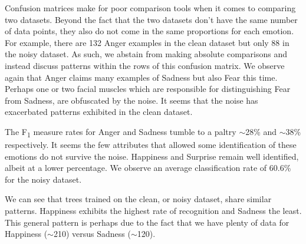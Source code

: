  


Confusion matrices make for poor comparison tools when it comes to comparing two datasets.
Beyond the fact that the two datasets don't have the same number of data points,
they also do not come in the same proportions for each emotion. For example, there are 132 Anger examples in the clean dataset but only
88 in the noisy dataset. As such, we abstain from making absolute comparisons and instead discuss patterns within the rows
of this confusion matrix. We observe again that Anger claims many examples of Sadness but also Fear this time. Perhaps one or two facial
muscles which are responsible for distinguishing Fear from Sadness, are obfuscated by the noise.
It seems that the noise has exacerbated patterns exhibited in the clean dataset.



The F\textsubscript{1} measure rates for Anger and Sadness tumble to a paltry $\sim$28\% and $\sim$38\% respectively.
It seems the few attributes that allowed some identification of these emotions do not survive the noise.
Happiness and Surprise remain well identified, albeit at a lower percentage.
We observe an average classification rate of 60.6\% for the noisy dataset.


We can see that trees trained on the clean, or noisy dataset, share similar patterns.
Happiness exhibits the highest rate of recognition and Sadness the least.
This general pattern is perhaps due to the fact that we have plenty of data for Happiness ($\sim$210) versus Sadness ($\sim$120).



